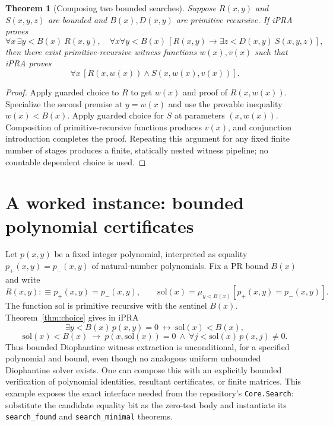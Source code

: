 \documentclass[11pt]{article}
\newtheorem{theorem}{Theorem}[section]
\begin{document}
\begin{theorem}[Composing two bounded searches]\label{thm:composition}
Suppose $R(x,y)$ and $S(x,y,z)$ are bounded and $B(x),D(x,y)$ are primitive recursive. If iPRA proves
\[\forall x\,\exists y<B(x)\ R(x,y),\quad \forall x\forall y<B(x)\,[R(x,y)\to\exists z<D(x,y)\ S(x,y,z)],\]
then there exist primitive-recursive witness functions $w(x),v(x)$ such that iPRA proves
\[\forall x\,[R(x,w(x))\land S(x,w(x),v(x))].\]
\end{theorem}
\begin{proof}
Apply guarded choice to $R$ to get $w(x)$ and proof of $R(x,w(x))$. Specialize the second premise at $y=w(x)$ and use the provable inequality $w(x)<B(x)$. Apply guarded choice for $S$ at parameters $(x,w(x))$. Composition of primitive-recursive functions produces $v(x)$, and conjunction introduction completes the proof. Repeating this argument for any fixed finite number of stages produces a finite, statically nested witness pipeline; no countable dependent choice is used.
\end{proof}

\section{A worked instance: bounded polynomial certificates}
Let $p(x,y)$ be a fixed integer polynomial, interpreted as equality $p_+(x,y)=p_-(x,y)$ of natural-number polynomials. Fix a PR bound $B(x)$ and write
\[R(x,y):\equiv p_+(x,y)=p_-(x,y),\qquad\mathrm{sol}(x)=\mu_{y<B(x)} [p_+(x,y)=p_-(x,y)].\]
The function $\mathrm{sol}$ is primitive recursive with the sentinel $B(x)$. Theorem~\ref{thm:choice} gives in iPRA
\[\exists y<B(x)\,p(x,y)=0\ \leftrightarrow\ \mathrm{sol}(x)<B(x),\]
\[\mathrm{sol}(x)<B(x)\ \to\ p(x,\mathrm{sol}(x))=0\ \wedge\ \forall j<\mathrm{sol}(x)\,p(x,j)\ne0.\]
Thus bounded Diophantine witness extraction is unconditional, for a specified polynomial and bound, even though no analogous uniform unbounded Diophantine solver exists. One can compose this with an explicitly bounded verification of polynomial identities, resultant certificates, or finite matrices. This example exposes the exact interface needed from the repository's \texttt{Core.Search}: substitute the candidate equality bit as the zero-test body and instantiate its \texttt{search\_found} and \texttt{search\_minimal} theorems.
\end{document}
